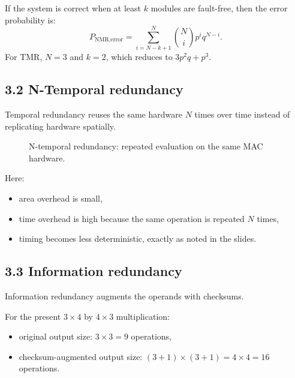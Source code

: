 \documentclass[11pt,a4paper]{article}
\begin{document}
If the system is correct when at least $k$ modules are fault-free, then the error probability is:
\[
\boxed{
P_{\text{NMR,error}}
=
\sum_{i=N-k+1}^{N}\binom{N}{i}p^i q^{N-i}.
}
\]
For TMR, $N=3$ and $k=2$, which reduces to $3p^2q+p^3$.

\subsection*{3.2 N-Temporal redundancy}
Temporal redundancy reuses the same hardware $N$ times over time instead of replicating hardware spatially.

\begin{figure}[h!]
\centering
{}
\caption{N-temporal redundancy: repeated evaluation on the same MAC hardware.}
\end{figure}

Here:
\begin{itemize}
  \item area overhead is small,
  \item time overhead is high because the same operation is repeated $N$ times,
  \item timing becomes less deterministic, exactly as noted in the slides.
\end{itemize}

\subsection*{3.3 Information redundancy}
Information redundancy augments the operands with checksums.

For the present $3\times 4$ by $4\times 3$ multiplication:
\begin{itemize}
  \item original output size: $3\times 3 = 9$ operations,
  \item checksum-augmented output size: $(3+1)\times(3+1)=4\times 4 = 16$ operations.
\end{itemize}
\end{document}
